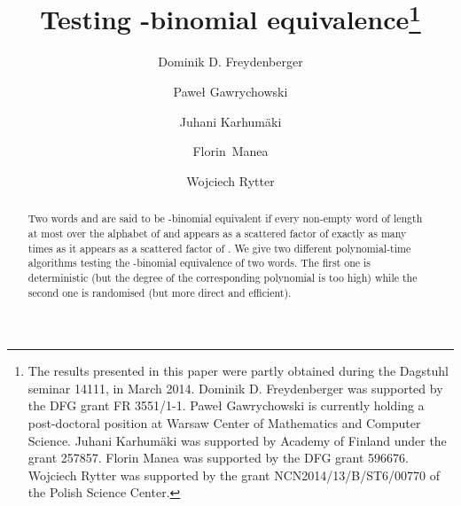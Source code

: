 \documentclass[runningheads]{llncs}
\begin{document}
\title{Testing -binomial equivalence\thanks{The results presented in this paper were partly obtained during the Dagstuhl seminar 14111, in March 2014. Dominik D. Freydenberger was supported by the DFG grant FR 3551/1-1. Pawe{\l} Gawrychowski is currently holding a post-doctoral position at Warsaw Center of Mathematics and Computer Science. Juhani Karhum\"aki was supported by Academy of Finland under the grant 257857. Florin Manea was supported by the DFG grant 596676. Wojciech Rytter was supported by the grant NCN2014/13/B/ST6/00770 of the Polish Science Center. }
}

\author{Dominik D. Freydenberger \and Pawe{\l} Gawrychowski \and Juhani Karhum\"aki \and \mbox{Florin Manea} \and Wojciech Rytter}


\maketitle

\begin{abstract}
Two words  and  are said to be -binomial equivalent if every non-empty word  of length at most  over the alphabet of  and  appears as a scattered factor of  exactly as many times as it appears as a scattered factor of . We give two different polynomial-time algorithms testing the -binomial equivalence of two words. The first one is deterministic (but the degree of the
corresponding polynomial is too high) while the second one is randomised (but more direct and efficient). \end{abstract}
\end{document}
